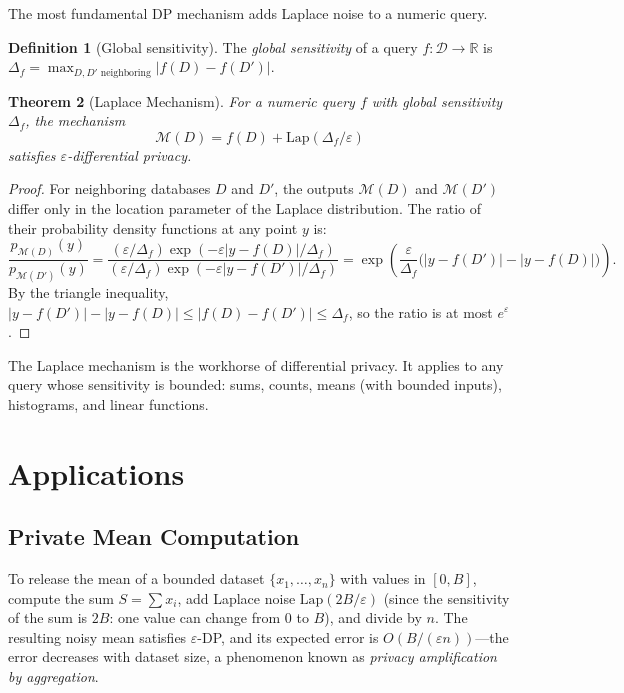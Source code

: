 \documentclass[twoside,12pt]{book}
\theoremstyle{plain}
\newtheorem{theorem}{Theorem}[chapter]
\theoremstyle{definition}
\newtheorem{definition}[theorem]{Definition}
\theoremstyle{remark}
\begin{document}
The most fundamental DP mechanism adds Laplace noise to a numeric query.

\begin{definition}[Global sensitivity]
The \emph{global sensitivity} of a query $f : \mathcal{D} \to \mathbb{R}$ is $\Delta_f = \max_{D, D' \text{ neighboring}} |f(D) - f(D')|$.
\end{definition}

\begin{theorem}[Laplace Mechanism]\label{thm:laplace}
For a numeric query $f$ with global sensitivity $\Delta_f$, the mechanism
\[
\mathcal{M}(D) = f(D) + \text{Lap}(\Delta_f / \varepsilon)
\]
satisfies $\varepsilon$-differential privacy.
\end{theorem}

\begin{proof}
For neighboring databases $D$ and $D'$, the outputs $\mathcal{M}(D)$ and $\mathcal{M}(D')$ differ only in the location parameter of the Laplace distribution. The ratio of their probability density functions at any point $y$ is:
\[
\frac{p_{\mathcal{M}(D)}(y)}{p_{\mathcal{M}(D')}(y)} = \frac{(\varepsilon/\Delta_f) \exp(-\varepsilon |y - f(D)| / \Delta_f)}{(\varepsilon/\Delta_f) \exp(-\varepsilon |y - f(D')| / \Delta_f)} = \exp\!\left(\frac{\varepsilon}{\Delta_f} \bigl(|y - f(D')| - |y - f(D)|\bigr)\right).
\]
By the triangle inequality, $|y - f(D')| - |y - f(D)| \leq |f(D) - f(D')| \leq \Delta_f$, so the ratio is at most $e^{\varepsilon}$.
\end{proof}

The Laplace mechanism is the workhorse of differential privacy. It applies to any query whose sensitivity is bounded: sums, counts, means (with bounded inputs), histograms, and linear functions.

\section{Applications}
\label{sec:dp-applications}

\subsection{Private Mean Computation}

To release the mean of a bounded dataset $\{x_1, \ldots, x_n\}$ with values in $[0, B]$, compute the sum $S = \sum x_i$, add Laplace noise $\text{Lap}(2B/\varepsilon)$ (since the sensitivity of the sum is $2B$: one value can change from $0$ to $B$), and divide by $n$. The resulting noisy mean satisfies $\varepsilon$-DP, and its expected error is $O(B / (\varepsilon n))$---the error decreases with dataset size, a phenomenon known as \emph{privacy amplification by aggregation}.
\end{document}
